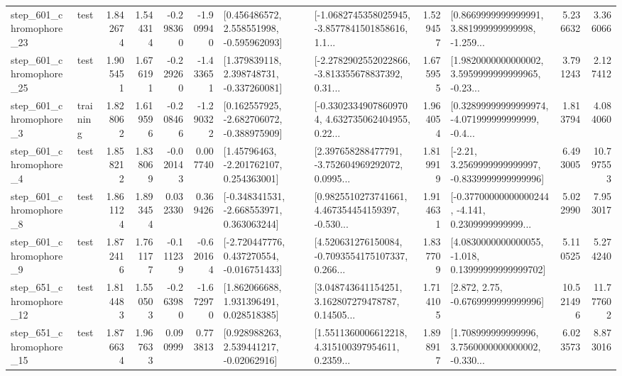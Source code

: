 \begin{tabular}{llrrrrllrlrr}
  step\_601\_chromophore\_23 &      test &      1.842674 &    1.544314 &     -0.298360 & -1.909940 &    [0.456486572, 2.558551998, -0.595962093] &  [-1.0682745358025945, -3.8577841501858616, 1.1... &       1.529457 &  [0.8669999999999991, 3.881999999999998, -1.259... &            5.236632 &          3.366066 \\
  step\_601\_chromophore\_25 &      test &      1.905451 &    1.676191 &     -0.229260 & -1.433651 &    [1.379839118, 2.398748731, -0.337260081] &  [-2.2782902552022866, -3.813355678837392, 0.31... &       1.675955 &  [1.9820000000000002, 3.5959999999999965, -0.23... &            3.791243 &          2.127412 \\
   step\_601\_chromophore\_3 &  training &      1.828062 &    1.619596 &     -0.208466 & -1.290322 &   [0.162557925, -2.682706072, -0.388975909] &  [-0.33023349078609704, 4.632735062404955, 0.22... &       1.964054 &  [0.32899999999999974, -4.071999999999999, -0.4... &            1.813794 &          4.084060 \\
   step\_601\_chromophore\_4 &      test &      1.858212 &    1.838069 &     -0.020143 &  0.007740 &     [1.45796463, -2.201762107, 0.254363001] &  [2.397658288477791, -3.752604969292072, 0.0995... &       1.819919 &   [-2.21, 3.2569999999999997, -0.8339999999999996] &            6.493005 &         10.797553 \\
   step\_601\_chromophore\_8 &      test &      1.861124 &    1.893454 &      0.032330 &  0.369426 &   [-0.348341531, -2.668553971, 0.363063244] &  [0.9825510273741661, 4.467354454159397, -0.530... &       1.914631 &  [-0.37700000000000244, -4.141, 0.2309999999999... &            5.022990 &          7.953017 \\
   step\_601\_chromophore\_9 &      test &      1.872416 &    1.761177 &     -0.111239 & -0.620164 &   [-2.720447776, 0.437270554, -0.016751433] &  [4.520631276150084, -0.7093554175107337, 0.266... &       1.837709 &  [4.0830000000000055, -1.018, 0.13999999999999702] &            5.110525 &          5.274240 \\
  step\_651\_chromophore\_12 &      test &      1.814483 &    1.550503 &     -0.263980 & -1.672970 &     [1.862066688, 1.931396491, 0.028518385] &  [3.048743641154251, 3.162807279478787, 0.14505... &       1.714105 &                 [2.872, 2.75, -0.6769999999999996] &           10.521496 &         11.777602 \\
  step\_651\_chromophore\_15 &      test &      1.876634 &    1.967633 &      0.090999 &  0.773813 &     [0.928988263, 2.539441217, -0.02062916] &  [1.5511360006612218, 4.315100397954611, 0.2359... &       1.898917 &  [1.708999999999996, 3.7560000000000002, -0.330... &            6.023573 &          8.873016 \\

\end{tabular}
